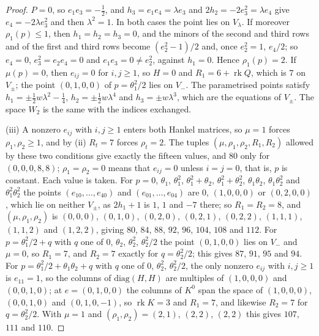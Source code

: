 \begin{proof}
$P=0$, so $e_{1}e_{3}=-\frac12$, and $h_{3}=e_{1}e_{4}=\lambda e_{3}$ and
$2h_{2}=-2e_{3}^{2}=\lambda e_{4}$ give $e_{4}=-2\lambda e_{3}^{2}$ and then
$\lambda^{2}=1$. In both cases the point lies on $V_{\lambda}$. If moreover $\rho_{1}(p)\le1$, then
$h_{1}=h_{2}=h_{3}=0$, and the minors of the second and third rows and of the
first and third rows become $(e_{2}^{2}-1)/2$ and, once $e_{2}^{2}=1$,
$e_{4}/2$; so $e_{4}=0$, $e_{3}^{2}=e_{2}e_{4}=0$ and $e_{1}e_{3}=0\ne
e_{2}^{2}$, against $h_{1}=0$. Hence $\rho_{1}(p)=2$. If $\mu(p)=0$, then
$e_{ij}=0$ for $i,j\ge1$, so $H=0$ and $R_{1}=6+\operatorname{rk}Q$, which is
$7$ on $V_{\pm}$; the point $(0,1,0,0)$ of $p=\theta_{1}^{2}/2$ lies on $V_{-}$.
The parametrised points satisfy $h_{1}=\pm\frac12w\lambda^{2}-\frac14$,
$h_{2}=\pm\frac12w\lambda^{4}$ and $h_{3}=\pm w\lambda^{3}$, which are the
equations of $V_{\pm}$. The space $W_{2}$ is the same with the indices
exchanged.

(iii) A nonzero $e_{ij}$ with $i,j\ge1$ enters both Hankel matrices, so
$\mu=1$ forces $\rho_{1},\rho_{2}\ge1$, and by (ii) $R_{t}=7$ forces
$\rho_{t}=2$. The tuples $(\mu,\rho_{1},\rho_{2},R_{1},R_{2})$ allowed by
these two conditions give exactly the fifteen values, and $80$ only for
$(0,0,0,8,8)$; $\rho_{1}=\rho_{2}=0$ means that $e_{ij}=0$ unless $i=j=0$,
that is, $p$ is constant. Each value is taken. For $p=0$, $\theta_{1}$,
$\theta_{1}^{2}$, $\theta_{1}^{2}+\theta_{2}$, $\theta_{1}^{2}+\theta_{2}^{2}$,
$\theta_{1}\theta_{2}$, $\theta_{1}\theta_{2}^{2}$ and
$\theta_{1}^{2}\theta_{2}^{2}$ the points $(e_{10},\dots,e_{40})$ and
$(e_{01},\dots,e_{04})$ are $0$, $(1,0,0,0)$ or $(0,2,0,0)$, which lie on
neither $V_{\pm}$, as $2h_{1}+1$ is $1$, $1$ and $-7$ there; so $R_{1}=R_{2}=8$,
and $(\mu,\rho_{1},\rho_{2})$ is $(0,0,0)$, $(0,1,0)$, $(0,2,0)$, $(0,2,1)$,
$(0,2,2)$, $(1,1,1)$, $(1,1,2)$ and $(1,2,2)$, giving $80$, $84$, $88$, $92$,
$96$, $104$, $108$ and $112$. For $p=\theta_{1}^{2}/2+q$ with $q$ one of $0$,
$\theta_{2}$, $\theta_{2}^{2}$, $\theta_{2}^{2}/2$ the point $(0,1,0,0)$ lies on
$V_{-}$ and $\mu=0$, so $R_{1}=7$, and $R_{2}=7$ exactly for $q=\theta_{2}^{2}/2$;
this gives $87$, $91$, $95$ and $94$. For $p=\theta_{1}^{2}/2+\theta_{1}\theta_{2}
+q$ with $q$ one of $0$, $\theta_{2}^{2}$, $\theta_{2}^{2}/2$, the only nonzero
$e_{ij}$ with $i,j\ge1$ is $e_{11}=1$, so the columns of $\mathrm{diag}(H,H)$
are multiples of $(1,0,0,0)$ and $(0,0,1,0)$; at $e=(0,1,0,0)$ the columns of
$K^{0}$ span the space of $(1,0,0,0)$, $(0,0,1,0)$ and $(0,1,0,-1)$, so
$\operatorname{rk}K=3$ and $R_{1}=7$, and likewise $R_{2}=7$ for
$q=\theta_{2}^{2}/2$. With $\mu=1$ and $(\rho_{1},\rho_{2})=(2,1)$, $(2,2)$,
$(2,2)$ this gives $107$, $111$ and $110$.


\end{proof}
